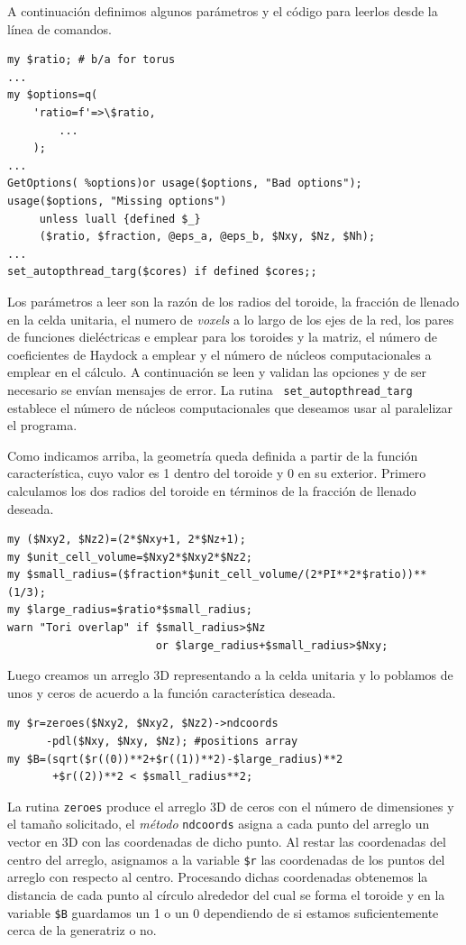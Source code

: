 \documentclass[12pt]{article}
\begin{document}
A continuación definimos algunos parámetros y el código para leerlos
desde la línea de comandos.
\begin{verbatim}
my $ratio; # b/a for torus
...
my $options=q(
	'ratio=f'=>\$ratio,
        ...
	);
...
GetOptions( %options)or usage($options, "Bad options");
usage($options, "Missing options")
     unless luall {defined $_}
     ($ratio, $fraction, @eps_a, @eps_b, $Nxy, $Nz, $Nh);
...
set_autopthread_targ($cores) if defined $cores;;
\end{verbatim}
Los parámetros a leer son la razón de los radios del toroide, la
fracción de llenado en la celda unitaria, el numero de {\em voxels} a lo
largo de los ejes de la red, los pares de funciones dieléctricas e
emplear para los toroides y la matriz, el número de coeficientes de Haydock a
emplear y el número de núcleos computacionales a emplear en el
cálculo. A continuación se leen y validan las opciones y de ser
necesario se envían mensajes de error. La rutina {\tt
  set\_autopthread\_targ} establece el número de núcleos computacionales
que deseamos usar al paralelizar el programa.

Como indicamos arriba, la geometría queda definida a partir de la
función característica, cuyo valor es 1 dentro del toroide y 0 en
su exterior. Primero calculamos los dos radios del toroide en términos
de la fracción de llenado deseada.
\begin{verbatim}
my ($Nxy2, $Nz2)=(2*$Nxy+1, 2*$Nz+1);
my $unit_cell_volume=$Nxy2*$Nxy2*$Nz2;
my $small_radius=($fraction*$unit_cell_volume/(2*PI**2*$ratio))**(1/3);
my $large_radius=$ratio*$small_radius;
warn "Tori overlap" if $small_radius>$Nz
                       or $large_radius+$small_radius>$Nxy;
\end{verbatim}
Luego creamos un arreglo 3D representando a la celda unitaria y lo
poblamos de unos y ceros de acuerdo a la función característica
deseada.
\begin{verbatim}
my $r=zeroes($Nxy2, $Nxy2, $Nz2)->ndcoords
      -pdl($Nxy, $Nxy, $Nz); #positions array
my $B=(sqrt($r((0))**2+$r((1))**2)-$large_radius)**2
       +$r((2))**2 < $small_radius**2;
\end{verbatim}
La rutina {\tt zeroes} produce el arreglo 3D de ceros con el número de
dimensiones y el tamaño
solicitado, el {\em método} {\tt ndcoords} asigna a cada punto del
arreglo un vector en 3D con las coordenadas de dicho punto. Al restar
las coordenadas del centro del arreglo, asignamos a la variable {\tt \$r}
las coordenadas de los puntos del arreglo con respecto al
centro. Procesando dichas coordenadas obtenemos la distancia de cada
punto al círculo alrededor del cual se forma el toroide y en la
variable {\tt \$B} guardamos un 1 o un 0 dependiendo de si estamos
suficientemente cerca de la generatriz o no.
\end{document}
